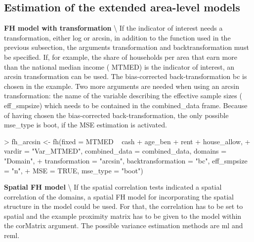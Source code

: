 \begin{example}
\subsection{Estimation of the extended area-level models} \label{sec:functionalityext}

\textbf{FH model with transformation} \textbackslash{}
If the indicator of interest needs a transformation, either log or arcsin, in addition to the function used in the previous subsection, the arguments \texorpdfstring%
{{\normalfont\ttfamily\hyphenchar{} transformation}}%
{transformation} and \texorpdfstring%
{{\normalfont\ttfamily\hyphenchar{} backtransformation}}%
{backtransformation} must be specified. If, for example, the share of households per area that earn more than the national median income (\texorpdfstring%
{{\normalfont\ttfamily\hyphenchar{} MTMED}}%
{MTMED}) is the indicator of interest, an arcsin transformation can be used. The bias-corrected back-transformation \texorpdfstring%
{{\normalfont\ttfamily\hyphenchar{} bc}}%
{bc} is chosen in the example. Two more arguments are needed when using an arcsin transformation: the name of the variable describing the effective sample sizes (\texorpdfstring%
{{\normalfont\ttfamily\hyphenchar{} eff\_smpsize}}%
{eff\_smpsize}) which needs to be contained in the \texorpdfstring%
{{\normalfont\ttfamily\hyphenchar{} combined\_data}}%
{combined\_data} frame. Because of having chosen the bias-corrected back-transformation, the only possible \texorpdfstring%
{{\normalfont\ttfamily\hyphenchar{} mse\_type}}%
{mse\_type} is \texorpdfstring%
{{\normalfont\ttfamily\hyphenchar{} boot}}%
{boot}, if the MSE estimation is activated.

\begin{example}
> fh_arcsin <- fh(fixed = MTMED ~ cash + age_ben + rent + house_allow,
+   vardir = "Var_MTMED", combined_data = combined_data, domains = "Domain",
+   transformation = "arcsin", backtransformation = "bc", eff_smpsize = "n",
+   MSE = TRUE, mse_type = "boot")
\end{example}

\textbf{Spatial FH model} \textbackslash{}
If the spatial correlation tests indicated a spatial correlation of the domains, a spatial FH model for incorporating the spatial structure in the model could be used. For that, the \texorpdfstring%
{{\normalfont\ttfamily\hyphenchar{} correlation}}%
{correlation} has to be set to \texorpdfstring%
{{\normalfont\ttfamily\hyphenchar{} spatial}}%
{spatial} and the example proximity matrix has to be given to the model within the \texorpdfstring%
{{\normalfont\ttfamily\hyphenchar{} corMatrix}}%
{corMatrix} argument. The possible variance estimation methods are \texorpdfstring%
{{\normalfont\ttfamily\hyphenchar{} ml}}%
{ml} and \texorpdfstring%
{{\normalfont\ttfamily\hyphenchar{} reml}}%
{reml}.


\end{example}
